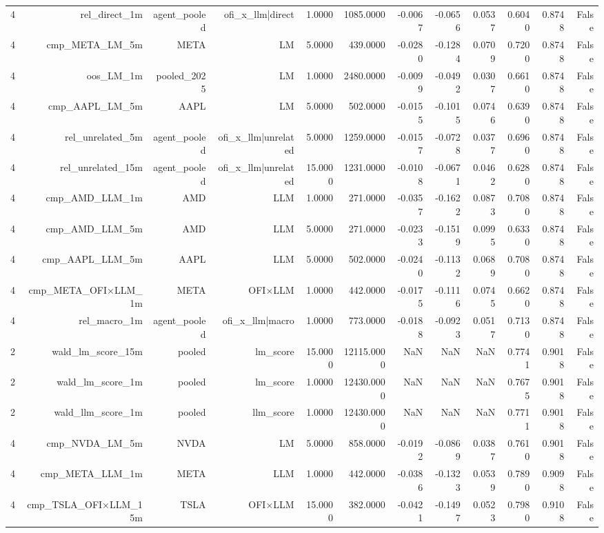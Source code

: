 \begin{table}[htbp]
\begin{tabular}{lrrrrrrrrrrr}
4 & rel\_direct\_1m & agent\_pooled & ofi\_x\_llm|direct & 1.0000 & 1085.0000 & -0.0067 & -0.0656 & 0.0537 & 0.6040 & 0.8748 & False \\
4 & cmp\_META\_LM\_5m & META & LM & 5.0000 & 439.0000 & -0.0280 & -0.1284 & 0.0709 & 0.7200 & 0.8748 & False \\
4 & oos\_LM\_1m & pooled\_2025 & LM & 1.0000 & 2480.0000 & -0.0099 & -0.0492 & 0.0307 & 0.6610 & 0.8748 & False \\
4 & cmp\_AAPL\_LM\_5m & AAPL & LM & 5.0000 & 502.0000 & -0.0155 & -0.1015 & 0.0746 & 0.6390 & 0.8748 & False \\
4 & rel\_unrelated\_5m & agent\_pooled & ofi\_x\_llm|unrelated & 5.0000 & 1259.0000 & -0.0157 & -0.0728 & 0.0377 & 0.6960 & 0.8748 & False \\
4 & rel\_unrelated\_15m & agent\_pooled & ofi\_x\_llm|unrelated & 15.0000 & 1231.0000 & -0.0108 & -0.0671 & 0.0462 & 0.6280 & 0.8748 & False \\
4 & cmp\_AMD\_LLM\_1m & AMD & LLM & 1.0000 & 271.0000 & -0.0357 & -0.1622 & 0.0873 & 0.7080 & 0.8748 & False \\
4 & cmp\_AMD\_LLM\_5m & AMD & LLM & 5.0000 & 271.0000 & -0.0233 & -0.1519 & 0.0995 & 0.6330 & 0.8748 & False \\
4 & cmp\_AAPL\_LLM\_5m & AAPL & LLM & 5.0000 & 502.0000 & -0.0240 & -0.1132 & 0.0689 & 0.7080 & 0.8748 & False \\
4 & cmp\_META\_OFI×LLM\_1m & META & OFI×LLM & 1.0000 & 442.0000 & -0.0175 & -0.1116 & 0.0745 & 0.6620 & 0.8748 & False \\
4 & rel\_macro\_1m & agent\_pooled & ofi\_x\_llm|macro & 1.0000 & 773.0000 & -0.0188 & -0.0923 & 0.0517 & 0.7130 & 0.8748 & False \\
2 & wald\_lm\_score\_15m & pooled & lm\_score & 15.0000 & 12115.0000 & NaN & NaN & NaN & 0.7741 & 0.9018 & False \\
2 & wald\_lm\_score\_1m & pooled & lm\_score & 1.0000 & 12430.0000 & NaN & NaN & NaN & 0.7675 & 0.9018 & False \\
2 & wald\_llm\_score\_1m & pooled & llm\_score & 1.0000 & 12430.0000 & NaN & NaN & NaN & 0.7711 & 0.9018 & False \\
4 & cmp\_NVDA\_LM\_5m & NVDA & LM & 5.0000 & 858.0000 & -0.0192 & -0.0869 & 0.0387 & 0.7610 & 0.9018 & False \\
4 & cmp\_META\_LLM\_1m & META & LLM & 1.0000 & 442.0000 & -0.0386 & -0.1323 & 0.0539 & 0.7890 & 0.9098 & False \\
4 & cmp\_TSLA\_OFI×LLM\_15m & TSLA & OFI×LLM & 15.0000 & 382.0000 & -0.0421 & -0.1497 & 0.0523 & 0.7980 & 0.9108 & False \\

\end{tabular}
\end{table}
